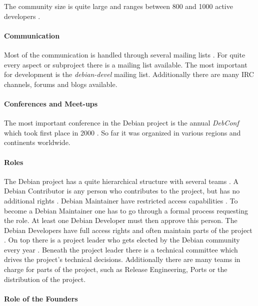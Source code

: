 The community size is quite large and ranges between 800 and 1000 active
developers \cite{Perrier2011,DebianOrg}.

\paragraph{Communication}

Most of the communication is handled through several mailing lists
\cite{DebianMailingLists,DebianFAQ,DebianNewMembers}. For quite every aspect or
subproject there is a mailing list available. The most important for
development is the \emph{debian-devel} mailing list. Additionally there are
many \ac{IRC} channels, forums and blogs available.

\paragraph{Conferences and Meet-ups}

The most important conference in the Debian project is the annual
\emph{DebConf} which took first place in 2000 \cite{DebianDebConf}. So far it
was organized in various regions and continents worldwide.

\paragraph{Roles}

The Debian project has a quite hierarchical structure with several teams
\cite{DebianOrg,Sadowski2008}. A Debian Contributor is any person who
contributes to the project, but has no additional rights \cite{DebianFAQ}.
Debian Maintainer have restricted access capabilities \cite{DebianMaintainer}.
To become a Debian Maintainer one has to go through a formal process requesting
the role. At least one Debian Developer must then approve this person. The
Debian Developers have full access rights and often maintain parts of the
project \cite{DebianDev}. On top there is a project leader who gets elected by
the Debian community every year \cite{DebianOrg,DebianVoting}. Beneath the
project leader there is a technical committee which drives the project's
technical decisions. Additionally there are many teams in charge for parts of
the project, such as Release Engineering, Ports or the distribution of the
project.

\paragraph{Role of the Founders}

